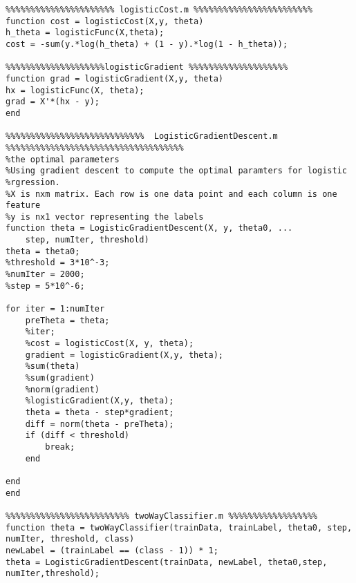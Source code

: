 \documentclass[12pt]{article} %
\theoremstyle{definition}\newtheorem{law}{Law}
\theoremstyle{plain}\newtheorem{jury}[law]{Jury}
\theoremstyle{remark}\newtheorem{juu}{Juu}
\theoremstyle{definition}\newtheorem{kuu}[law]{Kuu}
\theoremstyle{definition}\newtheorem{muu}{Muu}[section]
\theoremstyle{definition}\newtheorem{honoluu}{Honoluu}[section]
\theoremstyle{definition}\newtheorem{konoluu}[muu]{Konoluu}
\begin{document}
\begin{lstlisting}
%%%%%%%%%%%%%%%%%%%%%% logisticCost.m %%%%%%%%%%%%%%%%%%%%%%%%
function cost = logisticCost(X,y, theta)
h_theta = logisticFunc(X,theta);
cost = -sum(y.*log(h_theta) + (1 - y).*log(1 - h_theta));

%%%%%%%%%%%%%%%%%%%%logisticGradient %%%%%%%%%%%%%%%%%%%%
function grad = logisticGradient(X,y, theta)
hx = logisticFunc(X, theta); 
grad = X'*(hx - y);
end

%%%%%%%%%%%%%%%%%%%%%%%%%%%%  LogisticGradientDescent.m %%%%%%%%%%%%%%%%%%%%%%%%%%%%%%%%%%%%
%the optimal parameters
%Using gradient descent to compute the optimal paramters for logistic
%rgression.
%X is nxm matrix. Each row is one data point and each column is one feature
%y is nx1 vector representing the labels
function theta = LogisticGradientDescent(X, y, theta0, ...
    step, numIter, threshold)
theta = theta0;
%threshold = 3*10^-3;
%numIter = 2000;
%step = 5*10^-6;

for iter = 1:numIter
    preTheta = theta;
    %iter;
    %cost = logisticCost(X, y, theta);
    gradient = logisticGradient(X,y, theta);
    %sum(theta)
    %sum(gradient)
    %norm(gradient)
    %logisticGradient(X,y, theta);
    theta = theta - step*gradient;
    diff = norm(theta - preTheta);
    if (diff < threshold)
        break;
    end
    
end
end

%%%%%%%%%%%%%%%%%%%%%%%%% twoWayClassifier.m %%%%%%%%%%%%%%%%%%
function theta = twoWayClassifier(trainData, trainLabel, theta0, step, numIter, threshold, class)
newLabel = (trainLabel == (class - 1)) * 1;
theta = LogisticGradientDescent(trainData, newLabel, theta0,step, numIter,threshold);
\end{lstlisting}
\end{document}
